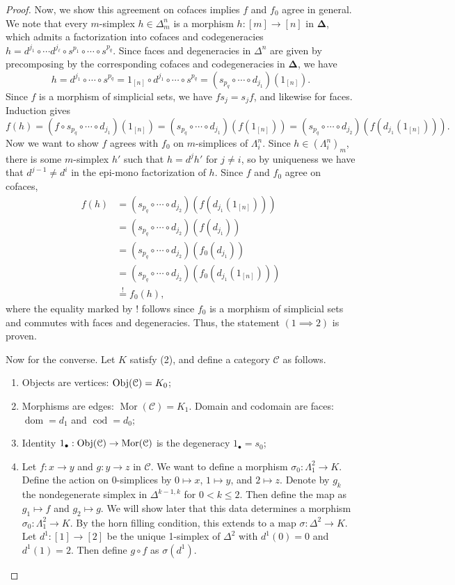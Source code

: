 \begin{proof}
	Now, we show this agreement on cofaces implies $f$ and $f_0$ agree in general. We note that every $m$-simplex $h\in\Delta^n_m$ is a morphism $h:[m]\to [n]$ in $\boldsymbol{\Delta} $, which admits a factorization into cofaces and codegeneracies $h=d^{j_1} \circ \cdots d^{j_\ell }\circ s^{p_1}\circ \cdots  \circ s^{p_q} $. Since faces and degeneracies in $\Delta^n$ are given by precomposing by the corresponding cofaces and codegeneracies in $\boldsymbol{\Delta} $, we have
	\[
		h=d^{j_1} \circ \cdots\circ s^{p_q} =1_{[n]} \circ d^{j_1} \circ \cdots \circ s^{p_q} =(s_{p_q} \circ \cdots\circ d_{j_1} )(1_{[n]} )
	.\]
	Since $f$ is a morphism of simplicial sets, we have $fs_j=s_jf$, and likewise for faces. Induction gives
	\[
		f(h)=(f\circ s_{p_q} \circ \cdots\circ d_{j_1} )(1_{[n]} )=(s_{p_q} \circ \cdots\circ d_{j_1} )(f(1_{[n]}))=(s_{p_q} \circ \cdots\circ d_{j_2} )(f(d_{j_1}(1_{[n]})))
	.\]
	Now we want to show $f$ agrees with $f_0$ on $m$-simplices of $\Lambda_i^n$. Since $h\in(\Lambda^n_i)_m$, there is some $m$-simplex $h'$ such that $h=d^jh'$ for $j\neq i$, so by uniqueness we have that $d^{j-1} \neq d^i$ in the epi-mono factorization of $h$. Since $f$ and $f_0$ agree on cofaces, 
	\begin{align*}
		f(h)&=(s_{p_q} \circ \cdots\circ d_{j_2} )(f(d_{j_1}(1_{[n]})))\\
		    &=(s_{p_q} \circ \cdots\circ d_{j_2} )(f(d_{j_1}))\\
		    &=(s_{p_q} \circ \cdots\circ d_{j_2} )(f_0(d_{j_1}))\\
		    &=(s_{p_q} \circ \cdots\circ d_{j_2} )(f_0(d_{j_1}(1_{[n]})))\\
		    &\overset{!}{=}f_0(h)
	,\end{align*}
	where the equality marked by $!$ follows since $f_0$ is a morphism of simplicial sets and commutes with faces and degeneracies. Thus, the statement $(1\implies 2)$ is proven.

	Now for the converse. Let $K$ satisfy (2), and define a category $\mathcal{C} $ as follows.
	\begin{enumerate}
		\item Objects are vertices: $\operatorname{Obj}(\mathcal{C} ) =K_0$;
		\item Morphisms are edges: $\operatorname{Mor} (\mathcal{C} )=K_1$. Domain and codomain are faces: $\operatorname{dom} =d_1$ and $\operatorname{cod} =d_0$;
		\item Identity $1_{\bullet} : \operatorname{Obj}(\mathcal{C} ) \to \operatorname{Mor} (\mathcal{C} )$ is the degeneracy $1_{\bullet} =s_0$;
		\item Let $f : x \to y$ and $g : y \to z$ in $\mathcal{C} $. We want to define a morphism $\sigma_0:\Lambda_1^2\to K$. Define the action on $0$-simplices by $0\mapsto x$, $1\mapsto y$, and $2\mapsto z$. Denote by $g_k$ the nondegenerate simplex in $\Delta^{k-1,k} $ for $0<k\leq 2$. Then define the map as $g_1\mapsto f$ and $g_2\mapsto g$. We will show later that this data determines a morphism $\sigma_0:\Lambda_1^2\to K$. By the horn filling condition, this extends to a map $\sigma : \Delta^2 \to K$. Let $d^1 : [1] \to [2]$ be the unique 1-simplex of $\Delta^2$ with $d^1(0)=0$ and $d^1(1)=2$. Then define $g\circ f$ as $\sigma(d^1)$.
	\end{enumerate}


\end{proof}
